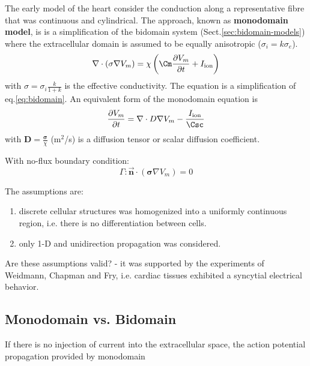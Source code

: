 The early model of the heart consider the conduction along a
representative fibre that was continuous and cylindrical. The approach, known
as {\bf monodomain model}, is is a simplification of the bidomain system
(Sect.\ref{sec:bidomain-models}) where the extracellular domain is 
assumed to be equally anisotropic
($\sigma_i = k\sigma_e$).
\begin{equation}
\nabla \cdot (\sigma\nabla V_m) = \chi \left(\Cm \frac{\partial
V_m}{\partial t} + I_\ion \right) 
\end{equation}
with $\sigma = \sigma_i \frac{k}{1+k}$ is the effective conductivity. The
equation is a simplification of eq.\ref{eq:bidomain}. An equivalent form of the
monodomain equation is 
\begin{equation}
\frac{\partial V_m}{\partial t} = \nabla\cdot D\nabla V_m - \frac{I_\ion}{\Csc}
\end{equation}
with $\mathbf{D}=\frac{\mathbf{\sigma}}{\chi}$ (m$^2$/s) is a diffusion tensor
or scalar diffusion coefficient. 




With no-flux boundary condition:
\begin{equation}
\Gamma: \vec{\mathbf{n}} \cdot \left( \mathbf{\sigma} \nabla V_m \right) = 0
\end{equation}


The assumptions are:
\begin{enumerate}
\item discrete cellular structures was homogenized into a uniformly
  continuous region, i.e. there is no differentiation between
  cells. 

\item only 1-D and unidirection propagation was considered.
\end{enumerate}
Are these assumptions valid? - it was supported by the experiments of
Weidmann, Chapman and Fry, i.e. cardiac tissues exhibited a syncytial
electrical behavior.



 
\subsection{Monodomain vs. Bidomain}

If there is no injection of current into the extracellular space, the action
potential propagation provided by monodomain 

